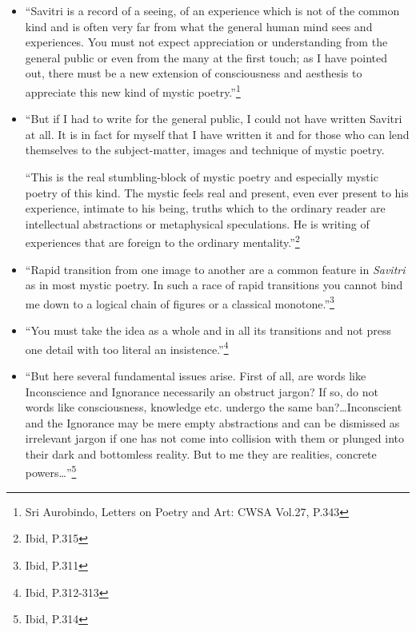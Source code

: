 \documentclass[12pt,a4paper]{book}
\begin{document}
\begin{itemize}
\renewcommand{\labelitemi}{$\diamond$}
\item ``Savitri is a record of a seeing, of an experience which is not
  of the common kind and is often very far from what the general human
  mind sees and experiences. You must not expect appreciation or
  understanding from the general public or even from the many at the
  first touch; as I have pointed out, there must be a new extension of
  consciousness and aesthesis to appreciate this new kind of mystic
  poetry.''\footnote{Sri Aurobindo, Letters on Poetry and Art: CWSA
    Vol.27, P.343}

\item ``But if I had to write for the general public, I could not have
  written Savitri at all. It is in fact for myself that I have written
  it and for those who can lend themselves to the subject-matter,
  images and technique of mystic poetry.

  ``This is the real stumbling-block of mystic poetry and especially
  mystic poetry of this kind. The mystic feels real and present, even
  ever present to his experience, intimate to his being, truths which
  to the ordinary reader are intellectual abstractions or metaphysical
  speculations. He is writing of experiences that are foreign to the
  ordinary mentality.''\footnote{Ibid, P.315}

\item ``Rapid transition from one image to another are a common
  feature in \emph{Savitri} as in most mystic poetry. In such a race
  of rapid transitions you cannot bind me down to a logical chain of
  figures or a classical monotone.''\footnote{Ibid, P.311}

\item ``You must take the idea as a whole and in all its transitions
  and not press one detail with too literal an
  insistence.''\footnote{Ibid, P.312-313}

\item ``But here several fundamental issues arise. First of all, are
  words like Inconscience and Ignorance necessarily an obstruct
  jargon? If so, do not words like consciousness, knowledge
  etc. undergo the same ban?\ldots Inconscient and the Ignorance may
  be mere empty abstractions and can be dismissed as irrelevant jargon
  if one has not come into collision with them or plunged into their
  dark and bottomless reality. But to me they are realities, concrete
  powers\ldots''\footnote{Ibid, P.314}


\end{itemize}
\end{document}
